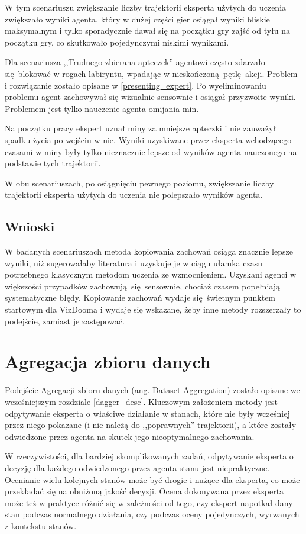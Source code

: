 \documentclass[polish,master,a4paper,oneside]{ppfcmthesis}
\begin{document}
W tym scenariuszu zwiększanie liczby trajektorii eksperta użytych do uczenia zwiększało wyniki agenta, który w dużej części gier osiągał wyniki bliskie maksymalnym i tylko sporadycznie dawał się na początku gry zajść od tyłu na początku gry, co skutkowało pojedynczymi niskimi wynikami.

Dla scenariusza ,,Trudnego zbierana apteczek'' agentowi często zdarzało się blokować w rogach labiryntu, wpadając w nieskończoną pętlę akcji. Problem i rozwiązanie zostało opisane w \ref{presenting_expert}. Po wyeliminowaniu problemu agent zachowywał się wizualnie sensownie i osiągał przyzwoite wyniki. Problemem jest tylko nauczenie agenta omijania min.

Na początku pracy ekspert uznał miny za mniejsze apteczki i nie zauważył spadku życia po wejściu w nie. Wyniki uzyskiwane przez eksperta wchodzącego czasami w miny były tylko nieznacznie lepsze od wyników agenta nauczonego na podstawie tych trajektorii.

W obu scenariuszach, po osiągnięciu pewnego poziomu, zwiększanie liczby trajektorii eksperta użytych do uczenia nie polepszało wyników agenta. 

\subsection{Wnioski}
W badanych scenariuszach metoda kopiowania zachowań osiąga znacznie lepsze wyniki, niż sugerowałaby literatura i uzyskuje je w ciągu ułamka czasu potrzebnego klasycznym metodom uczenia ze wzmocnieniem. Uzyskani agenci w większości przypadków zachowują się sensownie, chociaż czasem popełniają systematyczne błędy. Kopiowanie zachowań wydaje się świetnym punktem startowym dla VizDooma i wydaje się wskazane, żeby inne metody rozszerzały to podejście, zamiast je zastępować.
 \section{Agregacja zbioru danych}\label{dagger}

Podejście Agregacji zbioru danych (ang. Dataset Aggregation) \cite{DBLP:journals/corr/abs-1011-0686} zostało opisane we wcześniejszym rozdziale \ref{dagger_desc}. Kluczowym założeniem metody jest odpytywanie eksperta o właściwe działanie w stanach, które nie były wcześniej przez niego pokazane (i nie należą do ,,poprawnych'' trajektorii), a które zostały odwiedzone przez agenta na skutek jego nieoptymalnego zachowania.

W rzeczywistości, dla bardziej skomplikowanych zadań, odpytywanie eksperta o decyzję dla każdego odwiedzonego przez agenta stanu jest niepraktyczne. Ocenianie wielu kolejnych stanów może być drogie i nużące dla eksperta, co może przekładać się na obniżoną jakość decyzji. Ocena dokonywana przez eksperta może też w praktyce różnić się w zależności od tego, czy ekspert napotkał dany stan podczas normalnego działania, czy podczas oceny pojedynczych, wyrwanych z kontekstu stanów.
\end{document}
